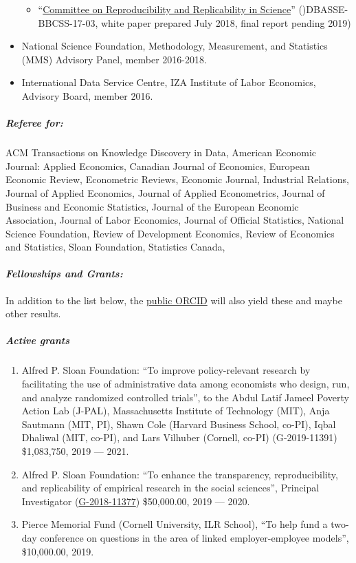 \documentclass[10pt,letterpaper]{report}
\begin{document}
\begin{itemize}
\begin{itemize}
		\item ``\href{https://www8.nationalacademies.org/pa/projectview.aspx?key=49906}{Committee on Reproducibility and Replicability in Science}'' ()DBASSE-BBCSS-17-03, white paper prepared July 2018, final report pending 2019)
	\end{itemize}
	\item National Science Foundation, Methodology, Measurement, and Statistics (MMS) Advisory Panel, member 2016-2018.
	\item International Data Service Centre, IZA Institute of Labor Economics, Advisory Board, member 2016.
\end{itemize}
\subparagraph{ Referee for:}
ACM   Transactions on Knowledge Discovery in Data, 
American Economic Journal: Applied Economics,
Canadian Journal of Economics, 
European Economic Review,  
Econometric Reviews, 
Economic Journal,  
Industrial Relations, 
Journal of Applied Economics, 
Journal of Applied Econometrics,
Journal of Business and Economic Statistics,  
Journal of the European Economic Association,
Journal of Labor   Economics, 
Journal of Official Statistics,
National Science Foundation,
Review of Development Economics, 
Review of Economics and Statistics,
Sloan Foundation,
Statistics Canada,



\paragraph{\it \bf Fellowships and Grants:}
In addition to the list below, the 
\href{http://orcid.org/0000-0001-5733-8932}{public ORCID} will also yield these and maybe other results.
\subparagraph{Active grants}
\begin{enumerate}
	\item Alfred P. Sloan Foundation: ``To improve policy-relevant research by facilitating the use of administrative data among economists who design, run, and analyze randomized controlled trials'', to the Abdul Latif Jameel Poverty Action	Lab (J-PAL), Massachusetts Institute	of Technology (MIT), Anja Sautmann (MIT, PI), Shawn Cole (Harvard Business School, co-PI), Iqbal Dhaliwal (MIT, co-PI), and Lars Vilhuber (Cornell, co-PI) (G‐2019-11391) \$1,083,750, 2019 --- 2021.
	\item Alfred P. Sloan Foundation: ``To enhance the transparency, reproducibility, and replicability of empirical research in the social sciences'', Principal Investigator  (\href{https://sloan.org/grant-detail/8801}{G-2018-11377})  \$50,000.00, 2019 --- 2020.
	\item Pierce Memorial Fund (Cornell University, ILR School), ``To help fund a two-day conference on questions in the area of linked employer-employee models'', \$10,000.00, 2019.
\end{enumerate}
\end{document}
